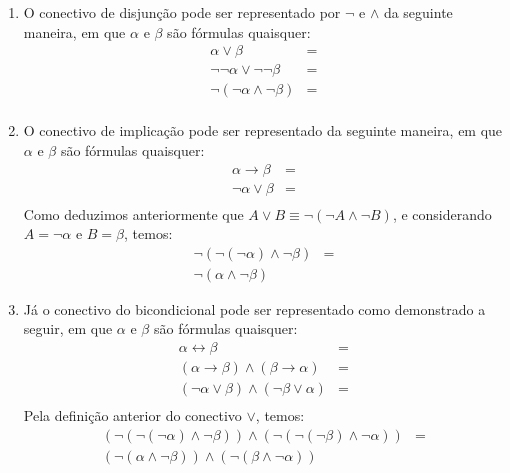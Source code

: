 \begin{enumerate}
\begin{enumerate}
		\item O conectivo de disjunção pode ser representado por $\neg$ e $\land$ da seguinte maneira, em que $\alpha$ e $\beta$ s\~ao f\'ormulas quaisquer:
			\[
				\begin{array}{lc}
					\alpha \lor \beta & = \\
					\neg \neg \alpha \lor \neg \neg \beta & = \\
					\neg(\neg \alpha \land \neg \beta) & = \\
				\end{array}
			\]
		\item O conectivo de implicação pode ser representado da seguinte maneira, em que $\alpha$ e $\beta$ s\~ao f\'ormulas quaisquer:
			\[
				\begin{array}{lc}
					\alpha \to \beta & = \\
					\neg\alpha \lor \beta & = \\
				\end{array}
			\]
		Como deduzimos anteriormente que $A \lor B \equiv \neg(\neg A \land \neg B)$, e considerando $A = \neg\alpha$ e $B = \beta$, temos:
		\[
			\begin{array}{lc}
				\neg(\neg(\neg\alpha) \land \neg \beta) & = \\
				\neg( \alpha \land \neg\beta)
			\end{array}
		\]
		\item Já o conectivo do bicondicional pode ser representado como demonstrado a seguir, em que $\alpha$ e $\beta$ s\~ao f\'ormulas quaisquer:
		\[
			\begin{array}{lc}
				\alpha \leftrightarrow \beta & = \\
				(\alpha \to \beta) \land (\beta \to \alpha) & = \\
				(\neg \alpha \lor \beta) \land ( \neg\beta \lor \alpha) & = \\
			\end{array}
		\]
		Pela defini\c{c}\~ao anterior do conectivo $\lor$, temos:
		\[
			\begin{array}{lc}
				(\neg(\neg (\neg\alpha) \land \neg\beta)) \land (\neg(\neg (\neg\beta) \land \neg\alpha)) & = \\
				(\neg(\alpha \land \neg\beta)) \land (\neg(\beta \land \neg\alpha))
			\end{array}
		\]
	\end{enumerate}	
	

\end{enumerate}
